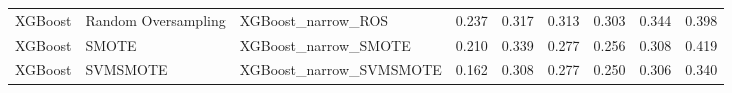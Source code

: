\begin{tabular}{lllllllll}
                     XGBoost & Random Oversampling &                           XGBoost\_narrow\_ROS & 0.237 &                     0.317 &                 0.313 &                  0.303 &                                   0.344 &     0.398 \\
                     XGBoost &               SMOTE &                         XGBoost\_narrow\_SMOTE & 0.210 &                     0.339 &                 0.277 &                  0.256 &                                   0.308 &     0.419 \\
                     XGBoost &            SVMSMOTE &                      XGBoost\_narrow\_SVMSMOTE & 0.162 &                     0.308 &                 0.277 &                  0.250 &                                   0.306 &     0.340 \\
\bottomrule
\end{tabular}
